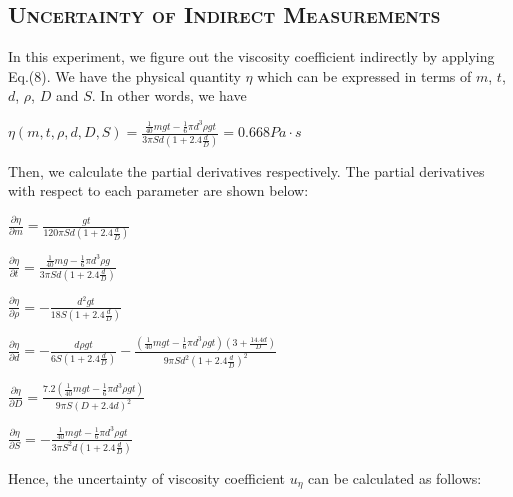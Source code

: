 \documentclass[a4paper,12pt]{article}
\begin{document}
\begin{appendices}
       \subsection{\textsc{Uncertainty of Indirect Measurements}}
      In this experiment, we figure out the viscosity coefficient indirectly by applying Eq.(8). We have the physical quantity $\eta$ which can be expressed in terms of $m$, $t$, $d$, $\rho$, $D$ and $S$. In other words, we have 
      \begin{center}
      $\displaystyle \eta(m,t,\rho,d,D,S) = \frac{\frac{1}{40}mgt-\frac{1}{6}\pi d^3\rho gt}{3\pi Sd(1+2.4\frac{d}{D})} = 0.668 Pa \cdot s$
      \end{center}
      \par Then, we calculate the partial derivatives respectively. The partial derivatives with respect to each parameter are shown below:
      \begin{center}
      $\displaystyle \frac{\partial \eta}{\partial m} = \frac{gt}{120\pi Sd(1+2.4\frac{d}{D})}$
      \end{center}
      \begin{center}
      $\displaystyle \frac{\partial \eta}{\partial t} = \frac{\frac{1}{40}mg-\frac{1}{6}\pi d^3\rho g}{3\pi Sd(1+2.4\frac{d}{D})}$
      \end{center}
      \begin{center}
      $\displaystyle \frac{\partial \eta}{\partial \rho} = -\frac{d^2gt}{18S(1+2.4\frac{d}{D})}$
      \end{center}
       \begin{center}
      $\displaystyle \frac{\partial \eta}{\partial d} =  -\frac{d \rho g t}{6S(1+2.4\frac{d}{D})} -  \frac{(\frac{1}{40}mgt-\frac{1}{6}\pi d^3\rho gt)(3 + \frac{14.4d}{D})}{9\pi Sd^2(1+2.4\frac{d}{D})^2}$
      \end{center}
       \begin{center}
      $\displaystyle \frac{\partial \eta}{\partial D} = \frac{7.2(\frac{1}{40}mgt-\frac{1}{6}\pi d^3 \rho g t)}{9\pi S (D+2.4d)^2}$
      \end{center}
      \begin{center}
      $\displaystyle \frac{\partial \eta}{\partial S} = - \frac{\frac{1}{40}mgt-\frac{1}{6}\pi d^3\rho gt}{3\pi S^2d(1+2.4\frac{d}{D})}$
      \end{center}
      \par Hence, the uncertainty of viscosity coefficient $u_{\eta}$ can be calculated as follows: 

\end{appendices}
\end{document}
